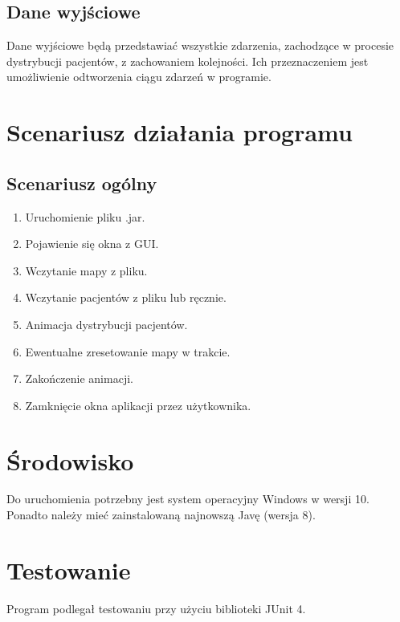 \documentclass[11pt, a4paper]{article}
\begin{document}
    \subsection{Dane wyjściowe}
    Dane wyjściowe będą przedstawiać wszystkie zdarzenia, zachodzące w procesie dystrybucji pacjentów, z zachowaniem kolejności. Ich przeznaczeniem jest umożliwienie odtworzenia ciągu zdarzeń w programie. 
\section{Scenariusz działania programu}
    \subsection{Scenariusz ogólny}
    \begin{enumerate}
        \item Uruchomienie pliku .jar.
        \item Pojawienie się okna z GUI.
        \item Wczytanie mapy z pliku.
        \item Wczytanie pacjentów z pliku lub ręcznie.
        \item Animacja dystrybucji pacjentów.
        \item Ewentualne zresetowanie mapy w trakcie.
        \item Zakończenie animacji.
        \item Zamknięcie okna aplikacji przez użytkownika.
    \end{enumerate}
    
\section{Środowisko}    
Do uruchomienia potrzebny jest system operacyjny Windows w wersji 10. Ponadto należy mieć zainstalowaną najnowszą Javę (wersja 8). 
\section{Testowanie}
Program podlegał testowaniu przy użyciu biblioteki JUnit 4.
\end{document}
